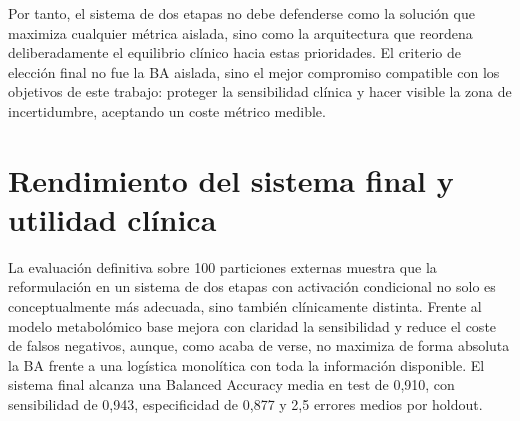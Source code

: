 Por tanto, el sistema de dos etapas no debe defenderse como la solución que maximiza cualquier métrica aislada, sino como la arquitectura que reordena deliberadamente el equilibrio clínico hacia estas prioridades. El criterio de elección final no fue la BA aislada, sino el mejor compromiso compatible con los objetivos de este trabajo: proteger la sensibilidad clínica y hacer visible la zona de incertidumbre, aceptando un coste métrico medible.

\begin{table}[ht]
\centering
\caption{Comparación resumida de $C$ en el Stage 2 dentro del sistema completo, ya bajo la evaluación externa de 100 particiones.}
\label{tab:stage2_c_grid}
\small
\setlength{\tabcolsep}{4pt}
\end{table}

\section{Rendimiento del sistema final y utilidad clínica}\label{sec:utilidad_clinica}

La evaluación definitiva sobre 100 particiones externas muestra que la reformulación en un sistema de dos etapas con activación condicional no solo es
conceptualmente más adecuada, sino también clínicamente distinta. Frente al modelo metabolómico base mejora con claridad
la sensibilidad y reduce el coste de falsos negativos, aunque, como acaba de verse, no maximiza de forma absoluta la BA
frente a una logística monolítica con toda la información disponible. El sistema final alcanza una Balanced Accuracy
media en test de 0,910, con sensibilidad de 0,943, especificidad de 0,877 y 2,5 errores medios por holdout.

